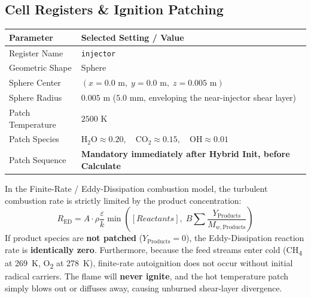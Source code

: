 \documentclass[11pt,a4paper]{article}
\begin{document}
\subsection{Cell Registers \& Ignition Patching}
\begin{tabularx}{\textwidth}{L{4.5cm} Y}
\toprule
\textbf{Parameter} & \textbf{Selected Setting / Value} \\
\midrule
Register Name & \texttt{injector} \\
Geometric Shape & Sphere \\
Sphere Center & $(x=0.0\text{ m}, \; y=0.0\text{ m}, \; z=0.005\text{ m})$ \\
Sphere Radius & $0.005\text{ m}$ ($5.0\text{ mm}$, enveloping the near-injector shear layer) \\
Patch Temperature & \textbf{$2500\text{ K}$} \\
Patch Species & \textbf{$\text{H}_2\text{O} \approx 0.20, \quad \text{CO}_2 \approx 0.15, \quad \text{OH} \approx 0.01$} \\
Patch Sequence & \textbf{Mandatory immediately after Hybrid Init, before Calculate} \\
\bottomrule
\end{tabularx}

\begin{tcolorbox}[alertbox, title={Why Product Species Patching is Mandatory for Combustion}]
In the Finite-Rate / Eddy-Dissipation combustion model, the turbulent combustion rate is strictly limited by the product concentration:
\[
R_\text{ED} = A \cdot \rho \frac{\varepsilon}{k} \min \left( [Reactants], \; B \sum \frac{Y_\text{Products}}{M_{w,\text{Products}}} \right)
\]
If product species are \textbf{not patched} ($Y_\text{Products} = 0$), the Eddy-Dissipation reaction rate is \textbf{identically zero}. Furthermore, because the feed streams enter cold (CH\textsubscript{4} at 269~K, O\textsubscript{2} at 278~K), finite-rate autoignition does not occur without initial radical carriers. The flame will \textbf{never ignite}, and the hot temperature patch simply blows out or diffuses away, causing unburned shear-layer divergence.
\end{tcolorbox}
\end{document}
